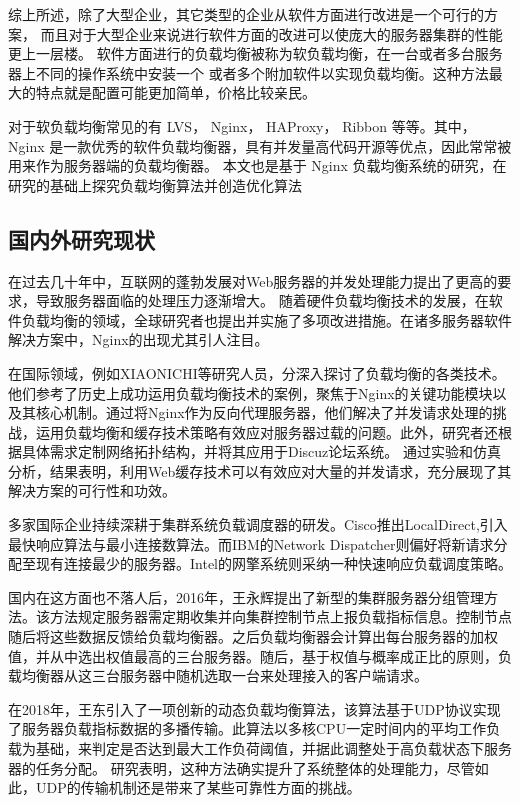 综上所述，除了大型企业，其它类型的企业从软件方面进行改进是一个可行的方案，
而且对于大型企业来说进行软件方面的改进可以使庞大的服务器集群的性能更上一层楼。
软件方面进行的负载均衡被称为软负载均衡，在一台或者多台服务器上不同的操作系统中安装一个
或者多个附加软件以实现负载均衡。这种方法最大的特点就是配置可能更加简单，价格比较亲民。

对于软负载均衡常见的有 LVS\cite{lijp}， Nginx\cite{Zepeng}， HAProxy\cite{li2019dynamic}， Ribbon 等等。其中，Nginx 是一款优秀的软件负载均衡器，具有并发量高代码开源等优点，因此常常被用来作为服务器端的负载均衡器。
本文也是基于 Nginx 负载均衡系统的研究，在研究的基础上探究负载均衡算法并创造优化算法

\subsection{国内外研究现状}

在过去几十年中，互联网的蓬勃发展对Web服务器的并发处理能力提出了更高的要求，导致服务器面临的处理压力逐渐增大。
随着硬件负载均衡技术的发展，在软件负载均衡的领域，全球研究者也提出并实施了多项改进措施。在诸多服务器软件解决方案中，Nginx的出现尤其引人注目。

在国际领域，例如XIAONICHI等研究人员\cite{chi2012web}，分深入探讨了负载均衡的各类技术。他们参考了历史上成功运用负载均衡技术的案例，聚焦于Nginx的关键功能模块以及其核心机制。通过将Nginx作为反向代理服务器，他们解决了并发请求处理的挑战，运用负载均衡和缓存技术策略有效应对服务器过载的问题。此外，研究者还根据具体需求定制网络拓扑结构，并将其应用于Discuz论坛系统。
通过实验和仿真分析，结果表明，利用Web缓存技术可以有效应对大量的并发请求，充分展现了其解决方案的可行性和功效。

多家国际企业持续深耕于集群系统负载调度器的研发。Cisco推出LocalDirect,引入最快响应算法与最小连接数算法。而IBM的Network Dispatcher则偏好将新请求分配至现有连接最少的服务器。Intel的网擎系统则采纳一种快速响应负载调度策略\cite{张淇2020服务器集群负载均衡算法在商务系统中的研究与应用}。

国内在这方面也不落人后，2016年，王永辉提出了新型的集群服务器分组管理方法。该方法规定服务器需定期收集并向集群控制节点上报负载指标信息。控制节点随后将这些数据反馈给负载均衡器。之后负载均衡器会计算出每台服务器的加权值，并从中选出权值最高的三台服务器。随后，基于权值与概率成正比的原则，负载均衡器从这三台服务器中随机选取一台来处理接入的客户端请求\cite{王永辉2015基于}。

在2018年，王东引入了一项创新的动态负载均衡算法，该算法基于UDP协议实现了服务器负载指标数据的多播传输。此算法以多核CPU一定时间内的平均工作负载为基础，来判定是否达到最大工作负荷阈值，并据此调整处于高负载状态下服务器的任务分配。
研究表明，这种方法确实提升了系统整体的处理能力，尽管如此，UDP的传输机制还是带来了某些可靠性方面的挑战\cite{王东2018动态反馈负载均衡策略的研究}。

